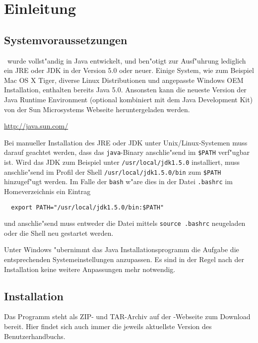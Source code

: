 
\chapter{Einleitung}



\section{Systemvoraussetzungen}

\TPML\ wurde vollst"andig in Java entwickelt, und ben"otigt zur Ausf"uhrung lediglich ein JRE oder
JDK in der Version 5.0 oder neuer.
Einige System, wie zum Beispiel Mac OS X Tiger, diverse Linux Distributionen und angepasste Windows
OEM Installation, enthalten bereits Java 5.0. Ansonsten kann die neueste Version der Java Runtime
Environment (optional kombiniert mit dem Java Development Kit) von der Sun Microsystems Webseite
heruntergeladen werden.

\url{http://java.sun.com/}

Bei manueller Installation des JRE oder JDK unter Unix/Linux-Systemen muss darauf geachtet werden, dass
das {\tt java}-Binary anschlie"send im {\tt \$PATH} verf"ugbar ist. Wird das JDK zum Beispiel unter
{\tt /usr/local/jdk1.5.0} installiert, muss anschlie"send im Profil der Shell {\tt /usr/local/jdk1.5.0/bin}
zum {\tt \$PATH} hinzugef"ugt werden. Im Falle der {\tt bash} w"are dies in der Datei {\tt .bashrc}
im Homeverzeichnis ein Eintrag
\begin{verbatim}
  export PATH="/usr/local/jdk1.5.0/bin:$PATH"
\end{verbatim}
und anschlie"send muss entweder die Datei mittels {\tt source .bashrc} neugeladen oder die
Shell neu gestartet werden.

Unter Windows "ubernimmt das Java Installationsprogramm die Aufgabe die entsprechenden Systemeinstellungen
anzupassen. Es sind in der Regel nach der Installation keine weitere Anpassungen mehr notwendig.



\section{Installation}

Das Programm steht als ZIP- und TAR-Archiv auf der \TPML-Webseite zum Download bereit. Hier findet sich
auch immer die jeweils aktuellste Version des Benutzerhandbuchs.

